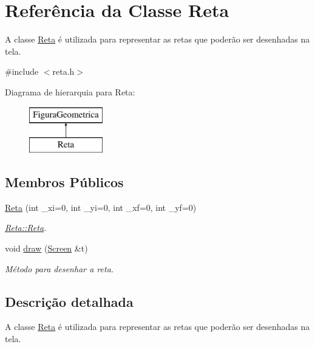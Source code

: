 \hypertarget{class_reta}{}\section{Referência da Classe Reta}
\label{class_reta}


A classe \mbox{\hyperlink{class_reta}{Reta}} é utilizada para representar as retas que poderão ser desenhadas na tela.  




{\ttfamily \#include $<$reta.\+h$>$}

Diagrama de hierarquia para Reta\+:\begin{figure}[H]
\begin{center}
\leavevmode
\includegraphics[height=2.000000cm]{class_reta}
\end{center}
\end{figure}
\subsection*{Membros Públicos}
\begin{DoxyCompactItemize}
\item 
\mbox{\hyperlink{class_reta_aa31eee96b0a044711a24907f18f2d2fb}{Reta}} (int \+\_\+xi=0, int \+\_\+yi=0, int \+\_\+xf=0, int \+\_\+yf=0)
\begin{DoxyCompactList}\small\item\em \mbox{\hyperlink{class_reta_aa31eee96b0a044711a24907f18f2d2fb}{Reta\+::\+Reta}}. \end{DoxyCompactList}\item 
void \mbox{\hyperlink{class_reta_ac2e9805183cd474b62bffd8b032cd780}{draw}} (\mbox{\hyperlink{class_screen}{Screen}} \&t)
\begin{DoxyCompactList}\small\item\em Método para desenhar a reta. \end{DoxyCompactList}\end{DoxyCompactItemize}


\subsection{Descrição detalhada}
A classe \mbox{\hyperlink{class_reta}{Reta}} é utilizada para representar as retas que poderão ser desenhadas na tela. 


